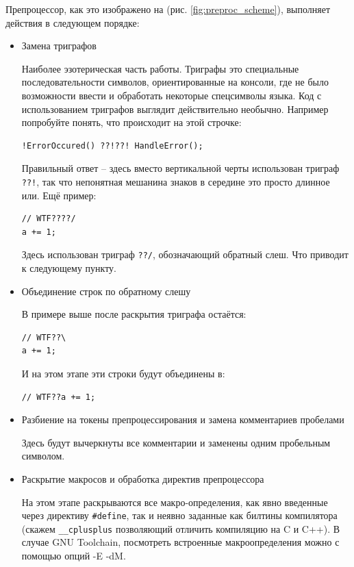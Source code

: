 \documentclass[a4paper,12pt,oneside]{article}
\begin{document}
Препроцессор, как это изображено на (рис. \ref{fig:preproc_scheme}), выполняет действия в следующем порядке:

\begin{itemize}
\item Замена триграфов 

Наиболее эзотерическая часть работы. Триграфы это специальные последовательности символов, ориентированные на консоли, где не было возможности ввести и обработать некоторые спецсимволы языка. Код с использованием триграфов выглядит действительно необычно. Например попробуйте понять, что происходит на этой строчке: 

\begin{lstlisting}
!ErrorOccured() ??!??! HandleError();
\end{lstlisting}

Правильный ответ -- здесь вместо вертикальной черты использован триграф \lstinline$??!$, так что непонятная мешанина знаков в середине это просто длинное или. Ещё пример: 

\begin{lstlisting}
// WTF????/
a += 1;
\end{lstlisting}

Здесь использован триграф \lstinline$??/$, обозначающий обратный слеш. Что приводит к следующему пункту.

\item Объединение строк по обратному слешу

В примере выше после раскрытия триграфа остаётся:
\begin{lstlisting}
// WTF??\
a += 1;
\end{lstlisting}
И на этом этапе эти строки будут объединены в:
\begin{lstlisting}
// WTF??a += 1;
\end{lstlisting}

\item Разбиение на токены препроцессирования и замена комментариев пробелами

Здесь будут вычеркнуты все комментарии и заменены одним пробельным символом.

\item Раскрытие макросов и обработка директив препроцессора

На этом этапе раскрываются все макро-определения, как явно введенные через директиву \lstinline!#define!, так и неявно заданные как билтины компилятора (скажем \lstinline!__cplusplus! позволяющий отличить компиляцию на C и C++). В случае GNU Toolchain, посмотреть встроенные макроопределения можно с помощью опций -E -dM.


\end{itemize}
\end{document}
